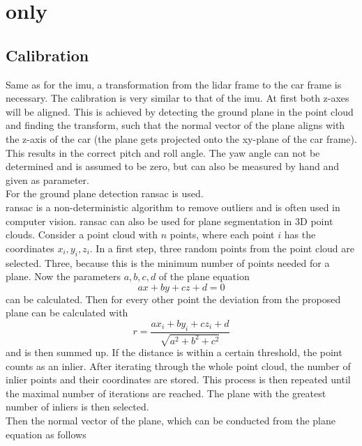 \section{ only}
\subsection{Calibration}
Same as for the \gls{imu}, a transformation from the \gls{lidar} frame to the car frame is necessary.
The calibration is very similar to that of the \gls{imu}.
At first both z-axes will be aligned.
This is achieved by detecting the ground plane in the point cloud and finding the transform, such that the normal vector of the plane aligns with the z-axis of the car (the plane gets projected onto the xy-plane of the car frame).
This results in the correct pitch and roll angle.
The yaw angle can not be determined and is assumed to be zero, but can also be measured by hand and given as parameter.\\
For the ground plane detection \gls{ransac} \cite{Fischler1981} is used.\\
\gls{ransac} is a non-deterministic algorithm to remove outliers and is often used in computer vision.
\gls{ransac} can also be used for plane segmentation in 3D point clouds.
Consider a point cloud with $n$ points, where each point $i$ has the coordinates $x_i, y_i, z_i$.
In a first step, three random points from the point cloud are selected.
Three, because this is the minimum number of points needed for a plane.
Now the parameters $a, b, c, d$ of the plane equation
\begin{equation}
    ax + by + cz + d = 0
\end{equation}
can be calculated.
Then for every other point the deviation from the proposed plane can be calculated with
\begin{equation}
    r = \frac{ax_i + by_i + cz_i + d}{\sqrt{a^2 + b^2 + c^2}}
\end{equation}
and is then summed up.
If the distance is within a certain threshold, the point counts as an inlier.
After iterating through the whole point cloud, the number of inlier points and their coordinates are stored.
This process is then repeated until the maximal number of iterations are reached.
The plane with the greatest number of inliers is then selected.\\
Then the normal vector of the plane, which can be conducted from the plane equation as follows
